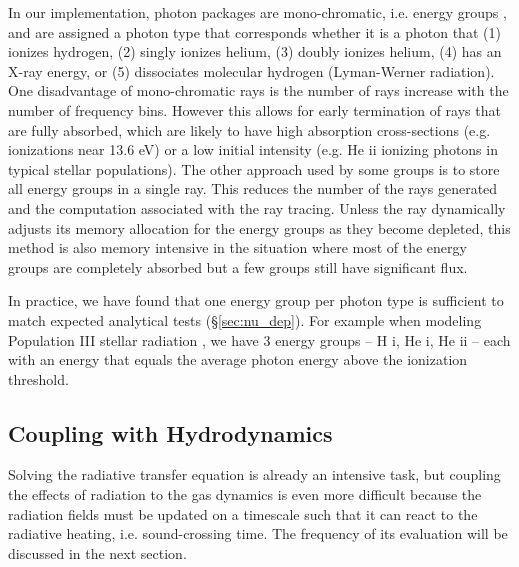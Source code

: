 \documentclass[useAMS,usenatbib,a4paper]{mn2e}
\begin{document}
In our implementation, photon packages are mono-chromatic, i.e. energy
groups \citep[][Ch. 6]{Mihalas84}, and are assigned a photon type that
corresponds whether it is a photon that (1) ionizes hydrogen, (2)
singly ionizes helium, (3) doubly ionizes helium, (4) has an X-ray
energy, or (5) dissociates molecular hydrogen (Lyman-Werner
radiation).  One disadvantage of mono-chromatic rays is the number of
rays increase with the number of frequency bins.  However this allows
for early termination of rays that are fully absorbed, which are
likely to have high absorption cross-sections (e.g. \hi ionizations
near 13.6 eV) or a low initial intensity (e.g. He {\sc ii} ionizing
photons in typical stellar populations).  The other approach used by
some groups \citep[e.g.][]{Trac07} is to store all energy groups in a
single ray.  This reduces the number of the rays generated and the
computation associated with the ray tracing.  Unless the ray
dynamically adjusts its memory allocation for the energy groups as
they become depleted, this method is also memory intensive in the
situation where most of the energy groups are completely absorbed but
a few groups still have significant flux.

In practice, we have found that one energy group per photon type is
sufficient to match expected analytical tests (\S\ref{sec:nu_dep}).
For example when modeling Population III stellar radiation
\citep[e.g.][for hydrogen ionizing radiation only]{Abel07,
  Wise08_Gal}, we have 3 energy groups -- H {\sc i}, He {\sc i}, He
{\sc ii} -- each with an energy that equals the average photon energy
above the ionization threshold.

\subsection{Coupling with Hydrodynamics}
\label{sec:coupling}

Solving the radiative transfer equation is already an intensive task,
but coupling the effects of radiation to the gas dynamics is even more
difficult because the radiation fields must be updated on a timescale
such that it can react to the radiative heating, i.e. sound-crossing
time.  The frequency of its evaluation will be discussed in the next
section.
\end{document}
